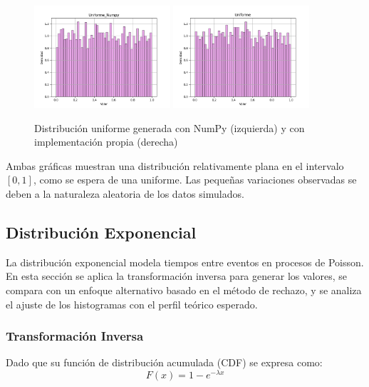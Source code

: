 \documentclass{article}
\begin{document}
\begin{figure}[H]
    \centering
    \includegraphics[width=0.45\textwidth]{Imagenes/Distribucion_Uniforme_Numpy.png}
    \includegraphics[width=0.45\textwidth]{Imagenes/Distribucion_Uniforme.png}
    \caption{Distribución uniforme generada con NumPy (izquierda) y con implementación propia (derecha)}
    \label{fig:uniforme}
\end{figure}

Ambas gráficas muestran una distribución relativamente plana en el intervalo $[0, 1]$, como se espera de una uniforme. Las pequeñas variaciones observadas se deben a la naturaleza aleatoria de los datos simulados.




\subsection{Distribución Exponencial}
La distribución exponencial modela tiempos entre eventos en procesos de Poisson. En esta sección se aplica la transformación inversa para generar los valores, se compara con un enfoque alternativo basado en el método de rechazo, y se analiza el ajuste de los histogramas con el perfil teórico esperado.

\subsubsection{Transformación Inversa}
Dado que su función de distribución acumulada (CDF) se expresa como:
\begin{equation}
    F(x) = 1 - e^{-\lambda x}
\end{equation}
\end{document}
